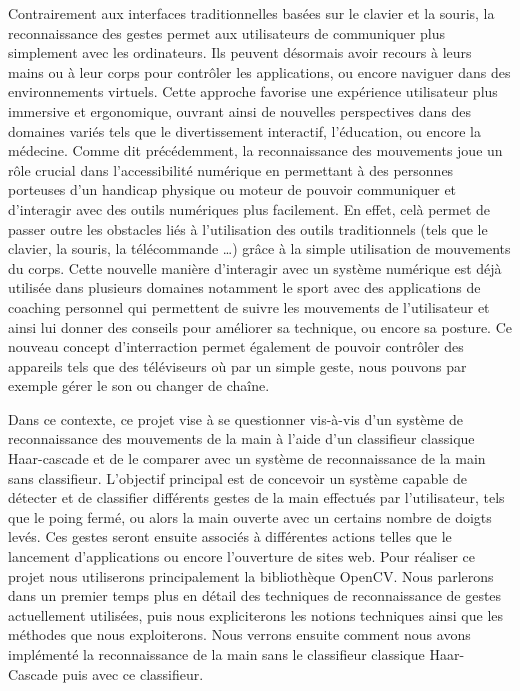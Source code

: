 \documentclass[11pt]{article}
\begin{document}
Contrairement aux interfaces traditionnelles basées sur le clavier et la souris, la reconnaissance des gestes permet aux utilisateurs de communiquer plus simplement avec les ordinateurs. Ils peuvent désormais avoir recours à leurs mains ou à leur corps pour contrôler les applications, ou encore naviguer dans des environnements virtuels. Cette approche favorise une expérience utilisateur plus immersive et ergonomique, ouvrant ainsi de nouvelles perspectives dans des domaines variés tels que le divertissement interactif, l'éducation, ou encore la médecine. Comme dit précédemment, la reconnaissance des mouvements joue un rôle crucial dans l’accessibilité numérique en permettant à des personnes porteuses d'un handicap physique  ou moteur de pouvoir communiquer et d'interagir avec des outils numériques plus facilement. En effet, celà permet de passer outre les obstacles liés à l’utilisation des outils traditionnels (tels que le clavier, la souris, la télécommande …) grâce à la simple utilisation de mouvements du corps. Cette nouvelle manière d'interagir avec un système numérique est déjà utilisée dans plusieurs domaines notamment le sport avec des applications de coaching personnel qui permettent de suivre les mouvements de l'utilisateur et ainsi lui donner des conseils pour améliorer sa technique, ou encore sa posture. Ce nouveau concept d'interraction permet également de pouvoir contrôler des appareils tels que des téléviseurs où par un simple geste, nous pouvons par exemple gérer le son ou changer de chaîne. \bigbreak

Dans ce contexte, ce projet vise à se questionner vis-à-vis d'un système de reconnaissance des mouvements de la main à l’aide d’un classifieur classique Haar-cascade et de le comparer avec un système de reconnaissance de la main sans classifieur.
L'objectif principal est de concevoir un système capable de détecter et de classifier différents gestes de la main effectués par l'utilisateur,
tels que le poing fermé, ou alors la main ouverte avec un certains nombre de doigts levés. Ces gestes seront ensuite associés à différentes
actions telles que le lancement d'applications ou encore l'ouverture de sites web.
Pour réaliser ce projet nous utiliserons principalement la bibliothèque OpenCV. Nous parlerons dans un premier temps plus en détail des techniques de reconnaissance de gestes actuellement utilisées, puis nous expliciterons les notions techniques ainsi que les méthodes que nous exploiterons. Nous verrons ensuite comment nous avons implémenté la reconnaissance de la main sans le classifieur classique Haar-Cascade puis avec ce classifieur.
\end{document}

